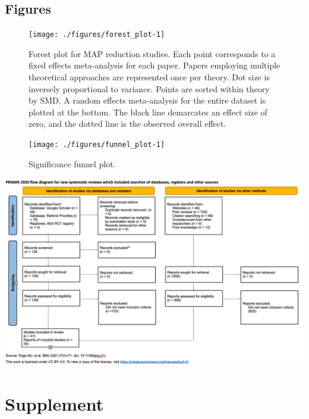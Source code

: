 \documentclass[sn-nature,referee,pdflatex]{sn-jnl}
\begin{document}
\subsection{Figures}\label{figures}

\begin{figure}[H]

{\centering \texttt{[image: ./figures/forest\_plot-1]} 

}

\caption{Forest plot for MAP reduction studies. Each point corresponds to a fixed effects meta-analysis for each paper. Papers employing multiple theoretical approaches are represented once per theory. Dot size is inversely proportional to variance. Points are sorted within theory by SMD. A random effects meta-analysis for the entire dataset is plotted at the bottom. The black line demarcates an effect size of zero, and the dotted line is the observed overall effect.}\label{fig:forest_plot}
\end{figure}

\begin{figure}[H]

{\centering \texttt{[image: ./figures/funnel\_plot-1]} 

}

\caption{Significance funnel plot.}\label{fig:funnel_plot}
\end{figure}

\begin{center}\includegraphics[width=1.2\linewidth,]{./figures/prisma-diagram} \end{center}

\newpage

\section{Supplement}\label{Sec5}
\end{document}
